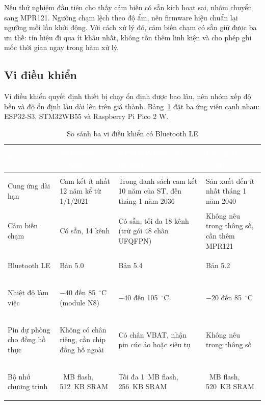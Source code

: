 Nếu thử nghiệm đầu tiên cho thấy cảm biến có sẵn kích hoạt sai, nhóm chuyển sang MPR121. Ngưỡng chạm lệch theo độ ẩm, nên firmware hiệu chuẩn lại ngưỡng mỗi lần khởi động. Với cách xử lý đó, cảm biến chạm có sẵn giữ được ba ưu thế: tín hiệu đi qua ít khâu nhất, không tốn thêm linh kiện và cho phép ghi mốc thời gian ngay trong hàm xử lý.

\subsection{Vi điều khiển}
Vi điều khiển quyết định thiết bị chạy ổn định được bao lâu, nên nhóm xếp độ bền và độ ổn định lâu dài lên trên giá thành. Bảng~\ref{tab:mcu} đặt ba ứng viên cạnh nhau: ESP32-S3, STM32WB55 và Raspberry Pi Pico 2 W.

\begin{table}[H]
    \centering
    \small
    \renewcommand{\arraystretch}{1.4}
    \caption{So sánh ba vi điều khiển có Bluetooth LE}
    \label{tab:mcu}
    \begin{tabular}{>{\bfseries\raggedright\arraybackslash}m{2.6cm} >{\raggedright\arraybackslash}m{3.7cm} >{\raggedright\arraybackslash}m{3.7cm} >{\raggedright\arraybackslash}m{3.4cm}}
        \toprule
        \rowcolor{haitayblue}
        \textcolor{white}{Tiêu chí} & \textcolor{white}{ESP32-S3 (chọn)} & \textcolor{white}{STM32WB55 (dự phòng)} & \textcolor{white}{Pico 2 W (loại)} \\
        \midrule
        \rowcolor{haitayblue!8}
        Cung ứng dài hạn & Cam kết ít nhất 12 năm kể từ 1/1/2021 & Trong danh sách cam kết 10 năm của ST, đến tháng 1 năm 2036 & Sản xuất đến ít nhất tháng 1 năm 2040 \\
        Cảm biến chạm & Có sẵn, 14 kênh & Có sẵn, tối đa 18 kênh (trừ gói 48 chân UFQFPN) & Không nêu trong thông số, cần thêm MPR121 \\
        \rowcolor{haitayblue!8}
        Bluetooth LE & Bản 5.0 & Bản 5.4 & Bản 5.2 \\
        Nhiệt độ làm việc & $-40$ đến 85~$^{\circ}$C (module N8) & $-40$ đến 105~$^{\circ}$C & $-20$ đến 85~$^{\circ}$C \\
        \rowcolor{haitayblue!8}
        Pin dự phòng cho đồng hồ thực & Không có chân riêng, cần chip đồng hồ ngoài & Có chân VBAT, nhận pin cúc áo hoặc siêu tụ & Không nêu trong thông số \\
        Bộ nhớ chương trình & 8~MB flash, 512~KB SRAM & Tối đa 1~MB flash, 256~KB SRAM & 4~MB flash, 520~KB SRAM \\
        \bottomrule
    \end{tabular}
\end{table}

